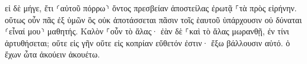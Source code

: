 \documentclass{openreader}
\begin{document}
εἰ δὲ μήγε, ἔτι ⸂αὐτοῦ πόρρω⸃ ὄντος πρεσβείαν ἀποστείλας ἐρωτᾷ ⸀τὰ πρὸς εἰρήνην. 
οὕτως οὖν πᾶς ἐξ ὑμῶν ὃς οὐκ ἀποτάσσεται πᾶσιν τοῖς ἑαυτοῦ ὑπάρχουσιν οὐ δύναται ⸂εἶναί μου⸃ μαθητής. 
Καλὸν ⸀οὖν τὸ ἅλας· ἐὰν δὲ ⸀καὶ τὸ ἅλας μωρανθῇ, ἐν τίνι ἀρτυθήσεται; 
οὔτε εἰς γῆν οὔτε εἰς κοπρίαν εὔθετόν ἐστιν· ἔξω βάλλουσιν αὐτό. ὁ ἔχων ὦτα ἀκούειν ἀκουέτω. 
\end{document}
